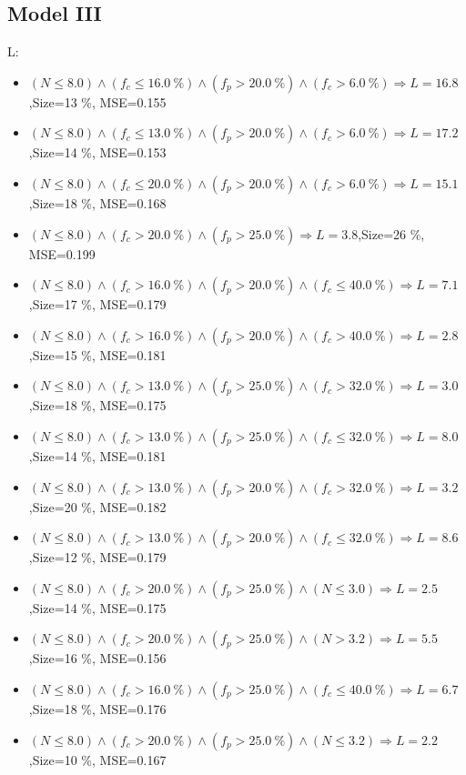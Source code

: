 \documentclass[numbered]{CSL}
\begin{document}
\subsection{Model III}
L:
\begin{itemize}
\item $(N \leq 8.0) \land (f_c \leq 16.0~\%) \land (f_p > 20.0~\%) \land (f_c > 6.0~\%) \Rightarrow L = 16.8$,\hfill Size=13 \%, MSE=0.155
\item $(N \leq 8.0) \land (f_c \leq 13.0~\%) \land (f_p > 20.0~\%) \land (f_c > 6.0~\%) \Rightarrow L = 17.2$,\hfill Size=14 \%, MSE=0.153
\item $(N \leq 8.0) \land (f_c \leq 20.0~\%) \land (f_p > 20.0~\%) \land (f_c > 6.0~\%) \Rightarrow L = 15.1$,\hfill Size=18 \%, MSE=0.168
\item $(N \leq 8.0) \land (f_c > 20.0~\%) \land (f_p > 25.0~\%) \Rightarrow L = 3.8$,\hfill Size=26 \%, MSE=0.199
\item $(N \leq 8.0) \land (f_c > 16.0~\%) \land (f_p > 20.0~\%) \land (f_c \leq 40.0~\%) \Rightarrow L = 7.1$,\hfill Size=17 \%, MSE=0.179
\item $(N \leq 8.0) \land (f_c > 16.0~\%) \land (f_p > 20.0~\%) \land (f_c > 40.0~\%) \Rightarrow L = 2.8$,\hfill Size=15 \%, MSE=0.181
\item $(N \leq 8.0) \land (f_c > 13.0~\%) \land (f_p > 25.0~\%) \land (f_c > 32.0~\%) \Rightarrow L = 3.0$,\hfill Size=18 \%, MSE=0.175
\item $(N \leq 8.0) \land (f_c > 13.0~\%) \land (f_p > 25.0~\%) \land (f_c \leq 32.0~\%) \Rightarrow L = 8.0$,\hfill Size=14 \%, MSE=0.181
\item $(N \leq 8.0) \land (f_c > 13.0~\%) \land (f_p > 20.0~\%) \land (f_c > 32.0~\%) \Rightarrow L = 3.2$,\hfill Size=20 \%, MSE=0.182
\item $(N \leq 8.0) \land (f_c > 13.0~\%) \land (f_p > 20.0~\%) \land (f_c \leq 32.0~\%) \Rightarrow L = 8.6$,\hfill Size=12 \%, MSE=0.179
\item $(N \leq 8.0) \land (f_c > 20.0~\%) \land (f_p > 25.0~\%) \land (N \leq 3.0) \Rightarrow L = 2.5$,\hfill Size=14 \%, MSE=0.175
\item $(N \leq 8.0) \land (f_c > 20.0~\%) \land (f_p > 25.0~\%) \land (N > 3.2) \Rightarrow L = 5.5$,\hfill Size=16 \%, MSE=0.156
\item $(N \leq 8.0) \land (f_c > 16.0~\%) \land (f_p > 25.0~\%) \land (f_c \leq 40.0~\%) \Rightarrow L = 6.7$,\hfill Size=18 \%, MSE=0.176
\item $(N \leq 8.0) \land (f_c > 20.0~\%) \land (f_p > 25.0~\%) \land (N \leq 3.2) \Rightarrow L = 2.2$,\hfill Size=10 \%, MSE=0.167

\end{itemize}
\end{document}
